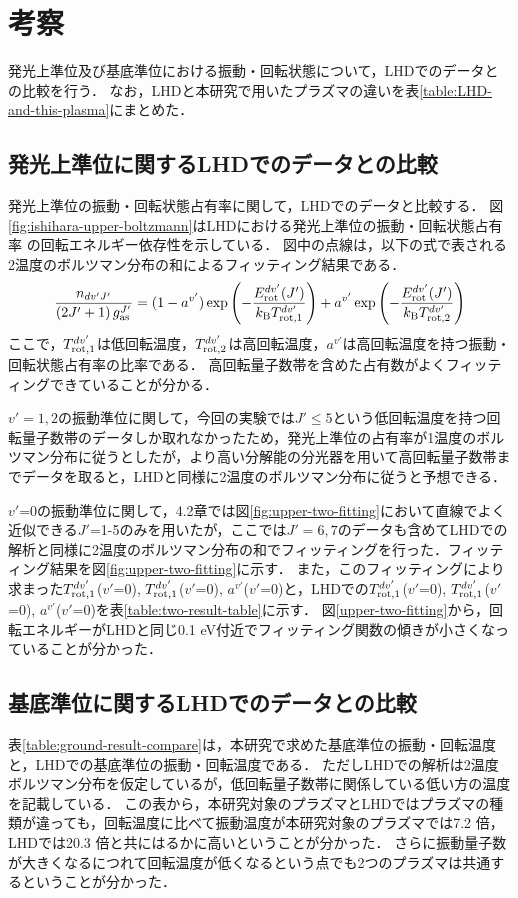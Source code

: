 \chapter{考察}
発光上準位及び基底準位における振動・回転状態について，LHDでのデータとの比較を行う．
なお，LHDと本研究で用いたプラズマの違いを表\ref{table:LHD-and-this-plasma}にまとめた\cite{ishihara}．

\section{発光上準位に関するLHDでのデータとの比較}
発光上準位の振動・回転状態占有率に関して，LHDでのデータと比較する．
図\ref{fig:ishihara-upper-boltzmann}はLHDにおける発光上準位の振動・回転状態占有率
の回転エネルギー依存性を示している\cite{ishihara}．
図中の点線は，以下の式で表される2温度のボルツマン分布の和によるフィッティング結果である．
\begin{equation}
    \frac{n_{dv'J'}}{\left( 2J'+1 \right)g^{J'}_{\rm as}} = (1-a^{v'})\exp \left( - \frac{E^{dv'}_{\rm rot}(J')}{k_{\rm B} T^{dv'}_{\rm rot,1}} \right)+ a^{v'} \exp \left( - \frac{E^{dv'}_{\rm rot}(J')}{k_{\rm B} T^{dv'}_{\rm rot,2}} \right)
\end{equation}
ここで，$T^{dv'}_{\rm rot,1}$は低回転温度，$T^{dv'}_{\rm rot,2}$は高回転温度，$a^{v'}$は高回転温度を持つ振動・回転状態占有率の比率である．
高回転量子数帯を含めた占有数がよくフィッティングできていることが分かる．

$v'=1,2$の振動準位に関して，今回の実験では$J' \leq 5$という低回転温度を持つ回転量子数帯のデータしか取れなかったため，発光上準位の占有率が1温度のボルツマン分布に従うとしたが，より高い分解能の分光器を用いて高回転量子数帯までデータを取ると，LHDと同様に2温度のボルツマン分布に従うと予想できる．

$v'$=0の振動準位に関して，4.2章では図\ref{fig:upper-two-fitting}において直線でよく近似できる$J'$=1-5のみを用いたが，ここでは$J'=6,7$のデータも含めてLHDでの解析と同様に2温度のボルツマン分布の和でフィッティングを行った．フィッティング結果を図\ref{fig:upper-two-fitting}に示す．
また，このフィッティングにより求まった$T^{dv'}_{\rm rot,1}$($v'$=0), $T^{dv'}_{\rm rot,1}$($v'$=0), $a^{v'}$($v'$=0)と，LHDでの$T^{dv'}_{\rm rot,1}$($v'$=0), $T^{dv'}_{\rm rot,1}$($v'$=0), $a^{v'}$($v'$=0)を表\ref{table:two-result-table}に示す．
図\ref{upper-two-fitting}から，回転エネルギーがLHDと同じ0.1 eV付近でフィッティング関数の傾きが小さくなっていることが分かった．

\section{基底準位に関するLHDでのデータとの比較}
表\ref{table:ground-result-compare}は，本研究で求めた基底準位の振動・回転温度と，LHDでの基底準位の振動・回転温度\cite{ishihara}である．
ただしLHDでの解析は2温度ボルツマン分布を仮定しているが，低回転量子数帯に関係している低い方の温度を記載している．
この表から，本研究対象のプラズマとLHDではプラズマの種類が違っても，回転温度に比べて振動温度が本研究対象のプラズマでは7.2 倍，LHDでは20.3 倍と共にはるかに高いということが分かった．
さらに振動量子数が大きくなるにつれて回転温度が低くなるという点でも2つのプラズマは共通するということが分かった．